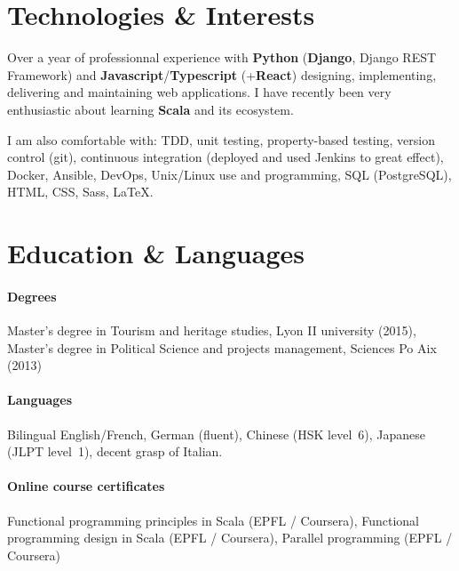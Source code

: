 \documentclass[10pt]{article}
\newcommand{\setparskip}{\setlength{\parskip}{.3em}}
\begin{document}
\hfill
\begin{minipage}[t]{0.42\textwidth}
  \setparskip
  \section*{Technologies \& Interests}

  Over a year of professionnal experience with \textbf{Python}
  (\textbf{Django}, Django REST Framework) and
  \textbf{Javascript}/\textbf{Typescript} (+\textbf{React}) designing,
  implementing, delivering and maintaining web applications. I have
  recently been very enthusiastic about learning \textbf{Scala} and its
  ecosystem.

  I am also comfortable with: TDD, unit testing, property-based testing,
  version control (git), continuous integration (deployed and used Jenkins
  to great effect), Docker, Ansible, DevOps, Unix/Linux use and
  programming, SQL (PostgreSQL), HTML, CSS, Sass, \LaTeX.

  \section*{Education \& Languages}

  \paragraph{Degrees} Master's degree in Tourism and heritage studies, Lyon II university (2015), Master's degree in Political Science and projects management, Sciences Po Aix (2013)

  \vspace{-1em}

  \paragraph{Languages} Bilingual English/French, German (fluent), Chinese (HSK level~6), Japanese (JLPT level~1), decent grasp of Italian.

  \vspace{-1em}

  \paragraph{Online course certificates} Functional programming principles in Scala (EPFL / Coursera), Functional programming design in Scala (EPFL / Coursera), Parallel programming (EPFL / Coursera)

\end{minipage}
\end{document}

